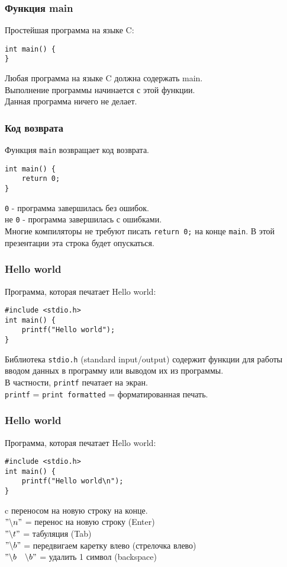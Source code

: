 \documentclass[12pt,pdf,hyperref={unicode}]{beamer}
\begin{document}
\begin{frame}[fragile]
\frametitle{Функция main}
Простейшая программа на языке C:
\begin{lstlisting}
int main() {
}
\end{lstlisting}
Любая программа на языке C должна содержать main.\\
Выполнение программы начинается с этой функции. \\
Данная программа ничего не делает.
\end{frame}

\begin{frame}[fragile]
\frametitle{Код возврата}
Функция \texttt{main} возвращает код возврата.\\ 
\begin{lstlisting}
int main() {
    return 0;
}
\end{lstlisting}
\texttt{0} - программа завершилась без ошибок. \\
не \texttt{0} - программа завершилась с ошибками. \\
Многие компиляторы не требуют писать \texttt{return 0;} на конце \texttt{main}. В этой презентации эта строка будет опускаться.
\end{frame}



\begin{frame}[fragile]
\frametitle{Hello world}
Программа, которая печатает Hello world:
\begin{lstlisting}
#include <stdio.h>
int main() {
    printf("Hello world");
}
\end{lstlisting}
Библиотека \texttt{stdio.h} (standard input/output) содержит функции для работы вводом данных в программу или выводом их из программы.\\
В частности, \texttt{printf} печатает на экран.\\
\texttt{printf} = \texttt{print formatted} = форматированная печать.
\end{frame}


\begin{frame}[fragile]
\frametitle{Hello world}
Программа, которая печатает Hello world:
\begin{lstlisting}
#include <stdio.h>
int main() {
    printf("Hello world\n");
}
\end{lstlisting}
c переносом на новую строку на конце.\\
$"\backslash n"$ = перенос на новую строку (Enter) \\
$"\backslash t"$ = табуляция (Tab) \\
$"\backslash b"$ = передвигаем каретку влево (стрелочка влево) \\
$"\backslash b\quad\backslash b"$ = удалить 1 символ (backspace) \\
\end{frame}
\end{document}
